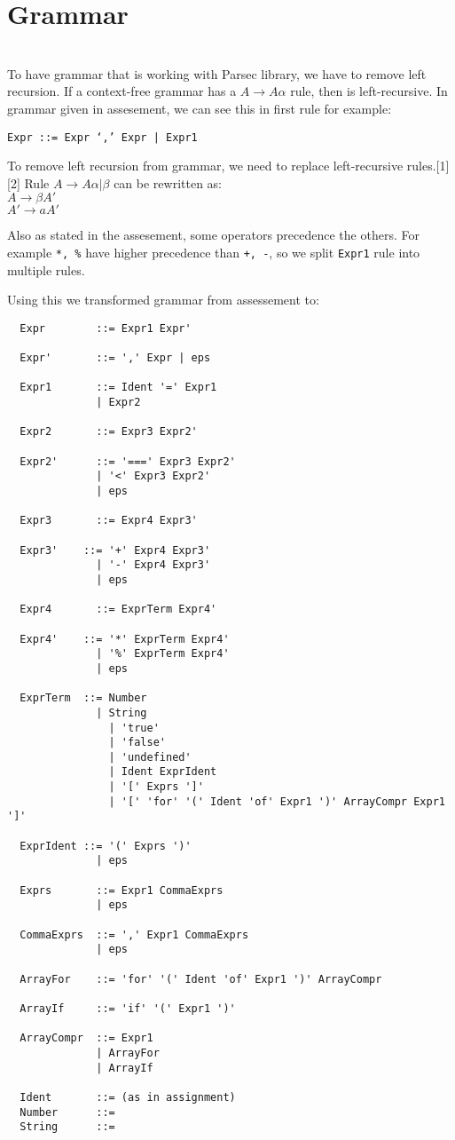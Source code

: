 \documentclass[11pt]{article}
\begin{document}
\section{Grammar} \\

To have grammar that is working with Parsec library, we have to remove left recursion. If a context-free grammar
has a $A  \rightarrow A\alpha$ rule, then is left-recursive. In grammar given in assesement, we can see this in first rule for example:
\begin{verbatim}
Expr ::= Expr ‘,’ Expr | Expr1
\end{verbatim}

To remove left recursion from grammar, we need to replace left-recursive rules.[1][2] Rule $A  \rightarrow A\alpha|\beta$ can be rewritten as:
\\
$A \rightarrow \beta A'$ \\
$A' \rightarrow aA'$

Also as stated in the assesement, some operators precedence the others. For example \texttt{*, \%} have higher precedence than \texttt{+, -}, so we split \texttt{Expr1} rule into multiple rules.

Using this we transformed grammar from assessement to:
\begin{verbatim}
  Expr        ::= Expr1 Expr'

  Expr'       ::= ',' Expr | eps

  Expr1       ::= Ident '=' Expr1
              | Expr2

  Expr2       ::= Expr3 Expr2'

  Expr2'      ::= '===' Expr3 Expr2'
              | '<' Expr3 Expr2'
              | eps

  Expr3       ::= Expr4 Expr3'

  Expr3'    ::= '+' Expr4 Expr3'
              | '-' Expr4 Expr3'
              | eps

  Expr4       ::= ExprTerm Expr4'

  Expr4'    ::= '*' ExprTerm Expr4'
              | '%' ExprTerm Expr4'
              | eps

  ExprTerm  ::= Number
              | String
            	| 'true'
            	| 'false'
            	| 'undefined'
            	| Ident ExprIdent
            	| '[' Exprs ']'
            	| '[' 'for' '(' Ident 'of' Expr1 ')' ArrayCompr Expr1 ']'

  ExprIdent ::= '(' Exprs ')'
              | eps

  Exprs       ::= Expr1 CommaExprs
              | eps

  CommaExprs  ::= ',' Expr1 CommaExprs
              | eps

  ArrayFor    ::= 'for' '(' Ident 'of' Expr1 ')' ArrayCompr

  ArrayIf     ::= 'if' '(' Expr1 ')'

  ArrayCompr  ::= Expr1
              | ArrayFor
              | ArrayIf

  Ident       ::= (as in assignment)
  Number      ::=
  String      ::=
\end{verbatim}
\end{document}
